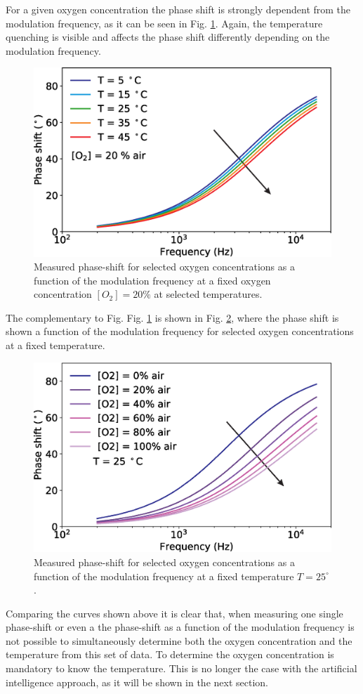 \documentclass[9pt,twocolumn,twoside,pdftex]{optica}
\begin{document}
For a given oxygen concentration the phase shift is strongly dependent from the modulation frequency, as it can be seen in Fig. \ref{fig:expdata2}. Again, the temperature quenching is visible and affects the phase shift differently depending on the modulation frequency.

\begin{figure}[htbp]
\centering
\includegraphics[width=8 cm]{phase_f_T.eps}
\caption{Measured phase-shift for selected oxygen concentrations as a function of the modulation frequency at a fixed oxygen concentration $[O_2]=20 \%$ at selected temperatures.}
\label{fig:expdata2}
\end{figure}

The complementary to Fig. Fig. \ref{fig:expdata2} is shown in Fig. \ref{fig:expdata3}, where the phase shift is shown a function of the modulation frequency for selected oxygen concentrations at a fixed temperature.

\begin{figure}[htbp]
\centering
\includegraphics[width=8 cm]{phase_f_O2.eps}
\caption{Measured phase-shift for selected oxygen concentrations as a function of the modulation frequency at a fixed temperature $T=25 ^{\circ}$ .}
\label{fig:expdata3}
\end{figure}

Comparing the curves shown above it is clear that, when measuring one single phase-shift or even a the phase-shift as a function of the modulation frequency is not possible to simultaneously determine both the oxygen concentration and the temperature from this set of data. To determine the oxygen concentration is mandatory to know the temperature. This is no longer the case with the artificial intelligence approach, as it will be shown in the next section. 
\end{document}
